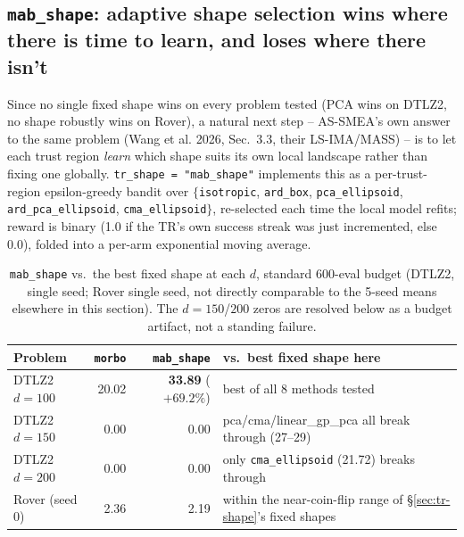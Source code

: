 \documentclass[11pt]{article}
\begin{document}
\subsection{\texttt{mab\_shape}: adaptive shape selection wins where there is time to learn, and loses where there isn't}

Since no single fixed shape wins on every problem tested (PCA wins on
DTLZ2, no shape robustly wins on Rover), a natural next step -- AS-SMEA's
own answer to the same problem (Wang et al. 2026, Sec.\ 3.3, their
LS-IMA/MASS) -- is to let each trust region \emph{learn} which shape suits
its own local landscape rather than fixing one globally. \texttt{tr\_shape
= "mab\_shape"} implements this as a per-trust-region epsilon-greedy
bandit over $\{$\texttt{isotropic}, \texttt{ard\_box}, \texttt{pca\_ellipsoid},
\texttt{ard\_pca\_ellipsoid}, \texttt{cma\_ellipsoid}$\}$, re-selected each
time the local model refits; reward is binary (1.0 if the TR's own success
streak was just incremented, else 0.0), folded into a per-arm exponential
moving average.

\begin{table}[h]
\centering
\caption{\texttt{mab\_shape} vs.\ the best fixed shape at each $d$, standard
600-eval budget (DTLZ2, single seed; Rover single seed, not directly
comparable to the 5-seed means elsewhere in this section). The $d{=}150$/$200$
zeros are resolved below as a budget artifact, not a standing failure.}
\label{tab:tr-shape-mab}
\begin{tabular}{lrrl}
\toprule
Problem & \texttt{morbo} & \texttt{mab\_shape} & vs.\ best fixed shape here \\
\midrule
DTLZ2 $d{=}100$ & 20.02 & \textbf{33.89} ($+69.2\%$) & best of all 8 methods tested \\
DTLZ2 $d{=}150$ & 0.00 & 0.00 & pca/cma/linear\_gp\_pca all break through (27--29) \\
DTLZ2 $d{=}200$ & 0.00 & 0.00 & only \texttt{cma\_ellipsoid} (21.72) breaks through \\
Rover (seed 0) & 2.36 & 2.19 & within the near-coin-flip range of \S\ref{sec:tr-shape}'s fixed shapes \\
\bottomrule
\end{tabular}
\end{table}
\end{document}
